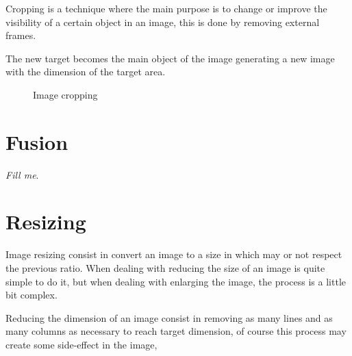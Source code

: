 \documentclass{article}
\begin{document}
	Cropping is a technique where the main purpose is to change or improve the visibility of a certain object in an image, 
	this is done by removing external frames. 

	The new target becomes the main object of the image generating a new image with the dimension of the target area.  

	\begin{figure}[H]
	  \centering
	  \caption{Image cropping}
	  \label{fig:cropping}
	\end{figure}


\section{Fusion}

	\textit{Fill me}.

\section{Resizing}

	Image resizing consist in convert an image to a size in which may or not respect the previous ratio.
	When dealing with reducing the size of an image is quite simple to do it, but when dealing with enlarging 
	the image, the process is a little bit complex.

	Reducing the dimension of an image consist in removing as many lines and as many columns as necessary to reach target dimension, of course this
	process may create some side-effect in the image, 
\end{document}
